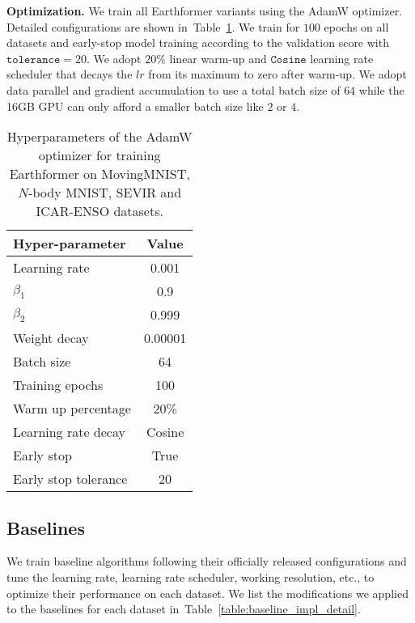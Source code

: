 \documentclass{article}
\newcommand{\tabref}[1]{Table~\ref{#1}}
\renewcommand{\paragraph}[1]{\textbf{#1. }}
\def\nbody{$N$-body MNIST}
\begin{document}
\paragraph{Optimization}
We train all Earthformer variants using the AdamW optimizer. Detailed configurations are shown in~\tabref{table:earthformer_optimization}. We train for $100$ epochs on all datasets and early-stop model training according to the validation score with $\mathtt{tolerance}=20$. We adopt $20\%$ linear warm-up and $\mathtt{Cosine}$ learning rate scheduler that decays the $lr$ from its maximum to zero after warm-up. We adopt data parallel and gradient accumulation to use a total batch size of $64$ while the 16GB GPU can only afford a smaller batch size like $2$ or $4$.

\begin{table}[!tb]
    \centering
    \caption{Hyperparameters of the AdamW optimizer for training Earthformer on MovingMNIST, \nbody{}, SEVIR and ICAR-ENSO datasets.}
    \begin{tabular}{l|c}
    	\toprule[1.5pt]
    	Hyper-parameter & Value \\
    	\midrule\midrule
        Learning rate               & 0.001     \\
        $\beta_1$                   & 0.9       \\
        $\beta_2$                   & 0.999     \\
        Weight decay                & 0.00001   \\
        Batch size                  & 64        \\
        Training epochs             & 100       \\
        Warm up percentage          & 20\%      \\
        Learning rate decay         & Cosine    \\
        Early stop                  & True      \\
        Early stop tolerance        & 20        \\
        \bottomrule[1.5pt]
    \end{tabular}
    \label{table:earthformer_optimization}
\end{table}

\subsection{Baselines}
We train baseline algorithms following their officially released configurations and tune the learning rate, learning rate scheduler, working resolution, etc., to optimize their performance on each dataset. We list the modifications we applied to the baselines for each dataset in~\tabref{table:baseline_impl_detail}.
\end{document}
